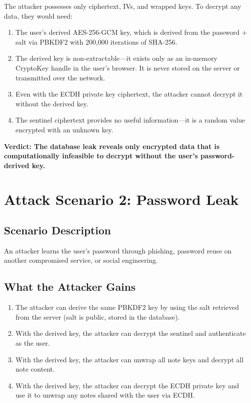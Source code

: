 The attacker possesses only ciphertext, IVs, and wrapped keys. To decrypt any data, they would need:

\begin{enumerate}
    \item The user's derived AES-256-GCM key, which is derived from the password + salt via PBKDF2 with 200,000 iterations of SHA-256.
    \item The derived key is non-extractable---it exists only as an in-memory CryptoKey handle in the user's browser. It is never stored on the server or transmitted over the network.
    \item Even with the ECDH private key ciphertext, the attacker cannot decrypt it without the derived key.
    \item The sentinel ciphertext provides no useful information---it is a random value encrypted with an unknown key.
\end{enumerate}

\textbf{Verdict: The database leak reveals only encrypted data that is computationally infeasible to decrypt without the user's password-derived key.}

\section{Attack Scenario 2: Password Leak}

\subsection{Scenario Description}

An attacker learns the user's password through phishing, password reuse on another compromised service, or social engineering.

\subsection{What the Attacker Gains}

\begin{enumerate}
    \item The attacker can derive the same PBKDF2 key by using the salt retrieved from the server (salt is public, stored in the database).
    \item With the derived key, the attacker can decrypt the sentinel and authenticate as the user.
    \item With the derived key, the attacker can unwrap all note keys and decrypt all note content.
    \item With the derived key, the attacker can decrypt the ECDH private key and use it to unwrap any notes shared with the user via ECDH.
\end{enumerate}

